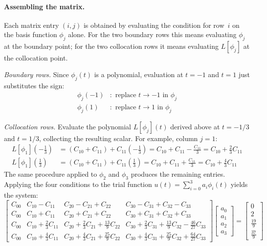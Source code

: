 \documentclass{article}
\begin{document}
\paragraph{Assembling the matrix.}
Each matrix entry $(i,j)$ is obtained by evaluating the condition for row~$i$ on the
basis function $\phi_j$ alone.  For the two boundary rows this means evaluating $\phi_j$
at the boundary point; for the two collocation rows it means evaluating $L[\phi_j]$ at
the collocation point.

\smallskip
\noindent\textit{Boundary rows.}  Since $\phi_j(t)$ is a polynomial, evaluation at
$t=-1$ and $t=1$ just substitutes the sign:
\begin{align*}
    \phi_j(-1) &: \text{ replace } t \to -1 \text{ in } \phi_j \\
    \phi_j(1)  &: \text{ replace } t \to  1 \text{ in } \phi_j
\end{align*}

\noindent\textit{Collocation rows.}  Evaluate the polynomial $L[\phi_j](t)$ derived above
at $t = -1/3$ and $t = 1/3$, collecting the resulting scalar.  For example, column $j=1$:
\begin{align*}
    L[\phi_1]\!\left(-\tfrac{1}{3}\right)
        &= \left(C_{10} + C_{11}\right) + C_{11}\!\left(-\tfrac{1}{3}\right)
         = C_{10} + C_{11} - \tfrac{C_{11}}{3}
         = C_{10} + \tfrac{2}{3}C_{11} \\
    L[\phi_1]\!\left(\tfrac{1}{3}\right)
        &= \left(C_{10} + C_{11}\right) + C_{11}\!\left(\tfrac{1}{3}\right)
         = C_{10} + C_{11} + \tfrac{C_{11}}{3}
         = C_{10} + \tfrac{4}{3}C_{11}
\end{align*}
The same procedure applied to $\phi_2$ and $\phi_3$ produces the remaining entries.
Applying the four conditions to the trial function $u(t) = \sum_{i=0}^3 a_i \phi_i(t)$ yields the system:
\begin{equation}
\begin{bmatrix}
C_{00}
  & C_{10} - C_{11}
  & C_{20} - C_{21} + C_{22}
  & C_{30} - C_{31} + C_{32} - C_{33} \\[4pt]
C_{00}
  & C_{10} + C_{11}
  & C_{20} + C_{21} + C_{22}
  & C_{30} + C_{31} + C_{32} + C_{33} \\[4pt]
C_{00}
  & C_{10} + \tfrac{2}{3}C_{11}
  & C_{20} + \tfrac{2}{3}C_{21} + \tfrac{13}{9}C_{22}
  & C_{30} + \tfrac{2}{3}C_{31} + \tfrac{13}{9}C_{32} - \tfrac{46}{27}C_{33} \\[6pt]
C_{00}
  & C_{10} + \tfrac{4}{3}C_{11}
  & C_{20} + \tfrac{4}{3}C_{21} + \tfrac{25}{9}C_{22}
  & C_{30} + \tfrac{4}{3}C_{31} + \tfrac{25}{9}C_{32} + \tfrac{64}{27}C_{33}
\end{bmatrix}
\begin{bmatrix} a_0 \\ a_1 \\ a_2 \\ a_3 \end{bmatrix}
=
\begin{bmatrix} 0 \\ 2 \\ \tfrac{19}{9} \\ \tfrac{37}{9} \end{bmatrix}
\end{equation}
\end{document}
